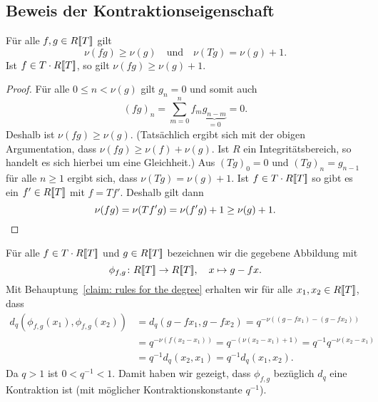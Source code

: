 \documentclass[a4paper, 10pt, numbers=noenddot]{scrartcl}
\begin{document}
\section{}
\label{section: calculation of units}



\subsection*{Beweis der Kontraktionseigenschaft}

\begin{claim}
  \label{claim: rules for the degree}
  Für alle $f, g \in R[\![T]\!]$ gilt
  \[
    \nu(f g) \geq \nu(g)
    \quad\text{und}\quad
    \nu(T g) = \nu(g) + 1.
  \]
  Ist $f \in T \cdot R[\![T]\!]$, so gilt $\nu(f g) \geq \nu(g) + 1$.
\end{claim}
\begin{proof}
  Für alle $0 \leq n < \nu(g)$ gilt $g_n = 0$ und somit auch
  \[
      (f g)_n
    = \sum_{m=0}^n f_m \underbrace{g_{n-m}}_{=0}
    = 0.
  \]
  Deshalb ist $\nu(f g) \geq \nu(g)$.  
  (Tatsächlich ergibt sich mit der obigen Argumentation, dass $\nu(fg) \geq \nu(f) + \nu(g)$.
  Ist $R$ ein Integritätsbereich, so handelt es sich hierbei um eine Gleichheit.)
  Aus $(T g)_0 = 0$ und $(T g)_n = g_{n-1}$ für alle $n \geq 1$ ergibt sich, dass $\nu(T g) = \nu(g) + 1$.
  Ist $f \in T \cdot R[\![T]\!]$ so gibt es ein $f' \in R[\![T]\!]$ mit $f = T f'$.
  Deshalb gilt dann
  \[
          \nu(f g)
    =     \nu(T f' g)
    =     \nu(f' g) + 1
    \geq  \nu(g) + 1.
    \qedhere
  \]
\end{proof}

Für alle $f \in T \cdot R[\![T]\!]$ und $g \in R[\![T]\!]$ bezeichnen wir die gegebene Abbildung mit
\[
  \phi_{f,g} \colon R[\![T]\!] \to R[\![T]\!],
  \quad
  x \mapsto g - fx.
\]
Mit Behauptung~\ref{claim: rules for the degree} erhalten wir für alle $x_1, x_2 \in R[\![T]\!]$, dass
\begin{align*}
        d_q( \phi_{f,g}(x_1), \phi_{f,g}(x_2) )
  &=    d_q(g - f x_1, g - f x_2)
   =    q^{-\nu((g - f x_1) - (g - f x_2))}
  \\
  &=    q^{-\nu(f (x_2 - x_1))}
   =    q^{-(\nu(x_2 - x_1) + 1)}
   =    q^{-1} q^{-\nu(x_2 - x_1)}
  \\
  &=    q^{-1} d_q(x_2, x_1)
   =    q^{-1} d_q(x_1, x_2).
\end{align*}
Da $q > 1$ ist $0 < q^{-1} < 1$.
Damit haben wir gezeigt, dass $\phi_{f,g}$ bezüglich $d_q$ eine Kontraktion ist (mit möglicher Kontraktionskonstante $q^{-1}$).
\end{document}
